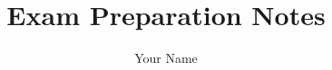 \documentclass[12pt, a4paper]{article}
\begin{document}
\title{Exam Preparation Notes}
\author{Your Name}

\begin{titlepage}
    \maketitle
\end{titlepage}

\tableofcontents
\newpage



\end{document}
